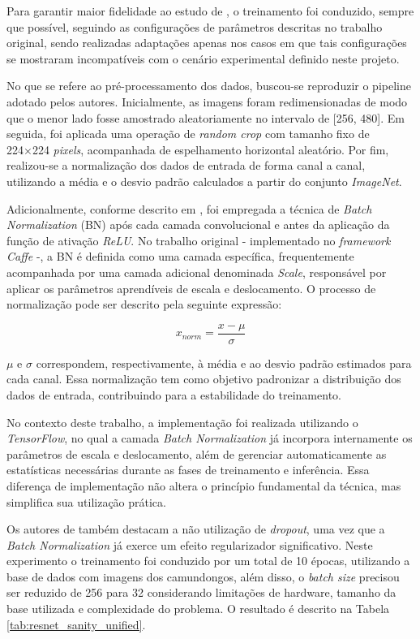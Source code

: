 Para garantir maior fidelidade ao estudo de \cite{he2016}, o treinamento foi conduzido, sempre que possível, seguindo as configurações de parâmetros descritas no trabalho original, sendo realizadas adaptações apenas nos casos em que tais configurações se mostraram incompatíveis com o cenário experimental definido neste projeto.

No que se refere ao pré-processamento dos dados, buscou-se reproduzir o pipeline adotado pelos autores. Inicialmente, as imagens foram redimensionadas de modo que o menor lado fosse amostrado aleatoriamente no intervalo de [256, 480]. Em seguida, foi aplicada uma operação de \textit{random crop} com tamanho fixo de 224×224 \textit{pixels}, acompanhada de espelhamento horizontal aleatório. Por fim, realizou-se a normalização dos dados de entrada de forma canal a canal, utilizando a média e o desvio padrão calculados a partir do conjunto \textit{ImageNet}.

Adicionalmente, conforme descrito em \cite{he2016}, foi empregada a técnica de \textit{Batch Normalization} (\acs{BN}) após cada camada convolucional e antes da aplicação da função de ativação \textit{\acs{ReLU}}. No trabalho original - implementado no \textit{framework} \textit{Caffe} \cite{jia2014caffe} -, a \acs{BN} é definida como uma camada específica, frequentemente acompanhada por uma camada adicional denominada \textit{Scale}, responsável por aplicar os parâmetros aprendíveis de escala e deslocamento. O processo de normalização pode ser descrito pela seguinte expressão:

\begin{equation}
	x_{norm} = \frac{x - \mu}{\sigma}
\end{equation}

$\mu$ e $\sigma$ correspondem, respectivamente, à média e ao desvio padrão estimados para cada canal. Essa normalização tem como objetivo padronizar a distribuição dos dados de entrada, contribuindo para a estabilidade do treinamento.

No contexto deste trabalho, a implementação foi realizada utilizando o \textit{TensorFlow}, no qual a camada \textit{Batch Normalization} já incorpora internamente os parâmetros de escala e deslocamento, além de gerenciar automaticamente as estatísticas necessárias durante as fases de treinamento e inferência. Essa diferença de implementação não altera o princípio fundamental da técnica, mas simplifica sua utilização prática.

Os autores de \cite{he2016} também destacam a não utilização de \textit{dropout}, uma vez que a \textit{Batch Normalization} já exerce um efeito regularizador significativo. Neste experimento o treinamento foi conduzido por um total de 10 épocas, utilizando a base de dados com imagens dos camundongos, além disso, o \textit{batch size} precisou ser reduzido de 256 para 32 considerando limitações de hardware, tamanho da base utilizada e complexidade do problema. O resultado é descrito na Tabela \ref{tab:resnet_sanity_unified}.

